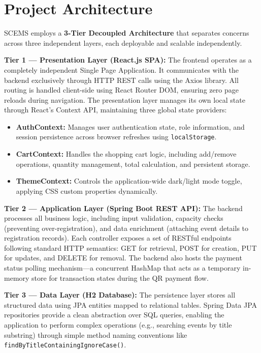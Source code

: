 \section{Project Architecture}

SCEMS employs a \textbf{3-Tier Decoupled Architecture} that separates concerns across three independent layers, each deployable and scalable independently.

\textbf{Tier 1 --- Presentation Layer (React.js SPA):}
The frontend operates as a completely independent Single Page Application. It communicates with the backend exclusively through HTTP REST calls using the Axios library. All routing is handled client-side using React Router DOM, ensuring zero page reloads during navigation. The presentation layer manages its own local state through React's Context API, maintaining three global state providers:
\begin{itemize}
    \item \textbf{AuthContext:} Manages user authentication state, role information, and session persistence across browser refreshes using \texttt{localStorage}.
    \item \textbf{CartContext:} Handles the shopping cart logic, including add/remove operations, quantity management, total calculation, and persistent storage.
    \item \textbf{ThemeContext:} Controls the application-wide dark/light mode toggle, applying CSS custom properties dynamically.
\end{itemize}

\textbf{Tier 2 --- Application Layer (Spring Boot REST API):}
The backend processes all business logic, including input validation, capacity checks (preventing over-registration), and data enrichment (attaching event details to registration records). Each controller exposes a set of RESTful endpoints following standard HTTP semantics: GET for retrieval, POST for creation, PUT for updates, and DELETE for removal. The backend also hosts the payment status polling mechanism---a concurrent HashMap that acts as a temporary in-memory store for transaction states during the QR payment flow.

\textbf{Tier 3 --- Data Layer (H2 Database):}
The persistence layer stores all structured data using JPA entities mapped to relational tables. Spring Data JPA repositories provide a clean abstraction over SQL queries, enabling the application to perform complex operations (e.g., searching events by title substring) through simple method naming conventions like \texttt{findByTitleContainingIgnoreCase()}.

